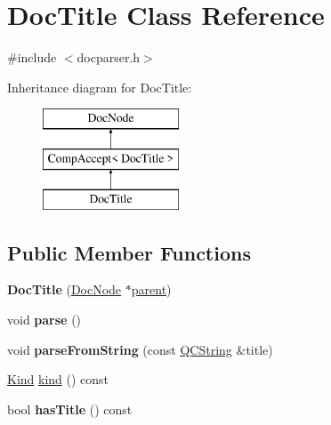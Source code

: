 \hypertarget{class_doc_title}{}\section{Doc\+Title Class Reference}
\label{class_doc_title}


{\ttfamily \#include $<$docparser.\+h$>$}

Inheritance diagram for Doc\+Title\+:\begin{figure}[H]
\begin{center}
\leavevmode
\includegraphics[height=3.000000cm]{class_doc_title}
\end{center}
\end{figure}
\subsection*{Public Member Functions}
\begin{DoxyCompactItemize}
\item 
\mbox{\label{class_doc_title_ace782e46c09c599ad975debb7bdd2480}} 
{\bfseries Doc\+Title} (\mbox{\hyperlink{class_doc_node}{Doc\+Node}} $\ast$\mbox{\hyperlink{class_doc_node_a73e8ad29a91cfceb0968eb00db71a23d}{parent}})
\item 
\mbox{\label{class_doc_title_a12306a4f4de4310c8201fac9d29eb627}} 
void {\bfseries parse} ()
\item 
\mbox{\label{class_doc_title_a873047fb25268ec576389256f88b2bcf}} 
void {\bfseries parse\+From\+String} (const \mbox{\hyperlink{class_q_c_string}{Q\+C\+String}} \&title)
\item 
\mbox{\hyperlink{class_doc_node_aebd16e89ca590d84cbd40543ea5faadb}{Kind}} \mbox{\hyperlink{class_doc_title_aa737085bbc08de7648765ae79d4f3925}{kind}} () const
\item 
\mbox{\label{class_doc_title_ae27763e0e3579fbd9d2d67e7fbebda47}} 
bool {\bfseries has\+Title} () const
\end{DoxyCompactItemize}

